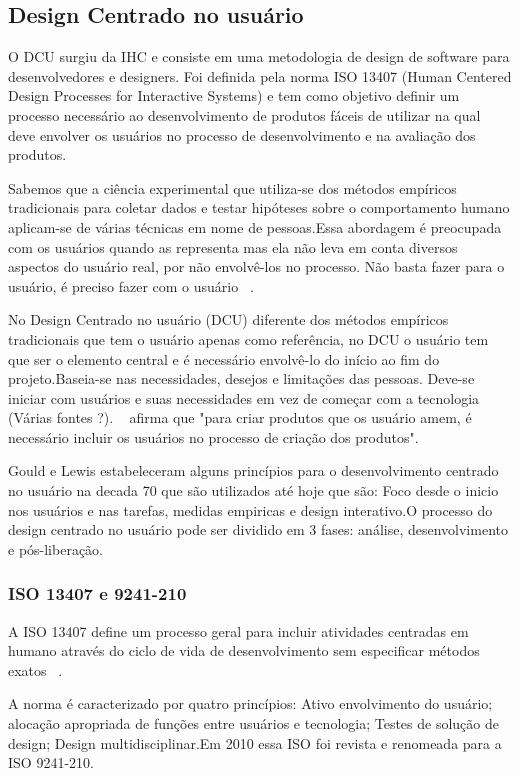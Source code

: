\subsection{Design Centrado no usuário}

O DCU surgiu da IHC e consiste em uma metodologia de design de software para desenvolvedores e designers. Foi definida pela norma ISO 13407 (Human Centered Design Processes for Interactive Systems) e tem como objetivo definir um processo necessário ao desenvolvimento de produtos fáceis de utilizar na qual deve envolver os usuários no processo de desenvolvimento e na avaliação dos produtos.

Sabemos que a ciência experimental que utiliza-se dos métodos empíricos tradicionais para coletar dados e testar hipóteses sobre o comportamento humano aplicam-se de várias técnicas em nome de pessoas.Essa abordagem é preocupada com os usuários quando as representa mas ela não leva em conta diversos aspectos do usuário real, por não envolvê-los no processo. Não basta fazer para o usuário, é preciso fazer com o usuário ~\cite{eason1995}. 

No Design Centrado no usuário (DCU) diferente dos métodos empíricos tradicionais que tem o usuário apenas como  referência, no DCU o usuário tem que ser o elemento central e é necessário envolvê-lo do início ao fim do projeto.Baseia-se nas necessidades, desejos e limitações das pessoas. Deve-se iniciar com usuários e suas necessidades em vez de começar com a tecnologia (Várias fontes ?). ~ afirma que "para criar produtos que os usuário amem, é necessário incluir os usuários no processo de criação dos produtos". 

Gould e Lewis estabeleceram alguns princípios para o desenvolvimento centrado no usuário na decada 70 que são utilizados até hoje que são: Foco desde o inicio nos usuários e nas tarefas, medidas empiricas e design interativo.O processo do design centrado no usuário pode ser dividido em 3 fases: análise, desenvolvimento e pós-liberação. 


\subsubsection{ISO 13407 e 9241-210}
	
A ISO 13407 define um processo geral para incluir atividades centradas em humano através do ciclo de vida de desenvolvimento sem especificar métodos exatos ~\cite{santos2012}.

A norma é caracterizado por quatro princípios: Ativo envolvimento do usuário; alocação apropriada de funções entre usuários e tecnologia; Testes de solução de design; Design multidisciplinar.Em 2010 essa ISO foi revista e renomeada para a ISO 9241-210.

